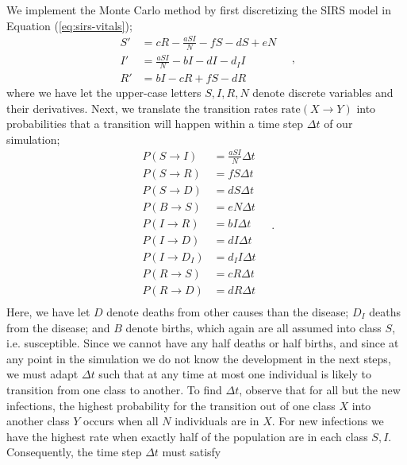 \documentclass[]{article}
\begin{document}
We implement the Monte Carlo method by first discretizing the SIRS model in Equation (\ref{eq:sirs-vitals});
\begin{equation} \label{eq:sirs-vitals-discrete}
\begin{aligned}
	S' &= cR - \frac{aSI}{N} - fS - dS + eN \\
	I' &= \frac{aSI}{N} - bI - dI -d_II\\
	R' &= bI - cR + fS - dR
\end{aligned} \quad ,
\end{equation}
where we have let the upper-case letters $S,I,R,N$ denote discrete variables and their derivatives. Next, we translate the transition rates $\mathrm{rate}(X \rightarrow Y)$ into probabilities that a transition will happen within a time step $\Delta t$ of our simulation;
\begin{equation} \label{eq:transition-probabilities}
\begin{aligned}
	P(S \rightarrow I) &= \frac{aSI}{N} \Delta t \\
	P(S \rightarrow R) &= fS \Delta t \\
	P(S \rightarrow D) &= dS \Delta t \\	
	P(B \rightarrow S) &= eN \Delta t \\	
	P(I \rightarrow R) &= bI \Delta t \\	
	P(I \rightarrow D) &= dI \Delta t \\	
	P(I \rightarrow D_I) &= d_II \Delta t \\	
	P(R \rightarrow S) &= cR \Delta t \\	
	P(R \rightarrow D) &= dR \Delta t \\		
\end{aligned} \quad .
\end{equation}
Here, we have let $D$ denote deaths from other causes than the disease; $D_I$ deaths from the disease; and $B$ denote births, which again are all assumed into class $S$, i.e. susceptible. Since we cannot have any half deaths or half births, and since at any point in the simulation we do not know the development in the next steps, we must adapt $\Delta t$ such that at any time at most one individual is likely to transition from one class to another. To find $\Delta t$, observe that for all but the new infections, the highest probability for the transition out of one class $X$ into another class $Y$ occurs when all $N$ individuals are in $X$. For new infections we have the highest rate when exactly half of the population are in each class $S,I$. Consequently, the time step $\Delta t$ must satisfy
\end{document}
